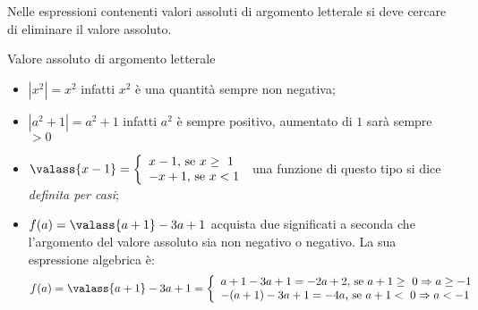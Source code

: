 Nelle espressioni contenenti valori assoluti di argomento letterale si deve 
cercare di eliminare il
valore assoluto.

\begin{esempio}{}{}
Valore assoluto di argomento letterale
\begin{itemize}[leftmargin=0cm, itemindent=.5cm]
\item \(\left|{x^{2}}\right|=x^{2}\) infatti \(x^{2}\) è una quantità sempre 
non 
negativa;
\item \(\left|{a^{2}+1}\right|=a^{2}+1\) infatti \(a^{2}\) è sempre 
positivo, aumentato di \(1\) sarà sempre \(>0\)
\item \(\valass{x-1}=\left\{\begin{array}{l}
x-1\text{, se }x\ge~1\\
-x+1\text{, se }x<1\end{array}\right.\) una funzione di questo tipo si dice 
\emph{definita per casi};
\item \(f(a)=\valass{a+1}-3a+1\) acquista due significati a seconda che 
l'argomento del valore assoluto sia non negativo o negativo. La sua 
espressione algebrica è:
\[
f(a)=\valass{a+1}-3a+1=\left\{\begin{array}{l}
a+1-3a+1=-2a+2 \text{, se }a+1\ge~0\Rightarrow a\ge-1\\
-(a+1)-3a+1=-4a \text{, se }a+1<~0\Rightarrow a<-1\end{array}\right.
\]
\end{itemize}
\end{esempio}
% 
% 
% 
